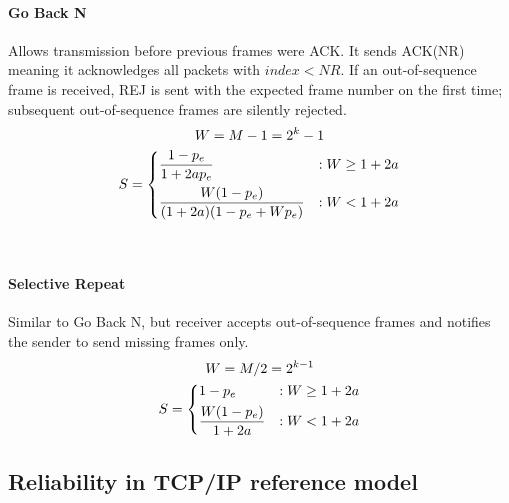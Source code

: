 \documentclass{form}
\begin{document}
\begin{minipage}[c]{0.58\textwidth}
    \begin{minipage}[t]{0.60\linewidth}
        \paragraph{Go Back N}
        Allows transmission before previous frames were ACK. It sends ACK(NR) meaning it acknowledges all packets with $index < NR$.
        If an out-of-sequence frame is received, REJ is sent with the expected frame number on the first time; subsequent out-of-sequence frames are silently rejected.
        \vspace{-1em}
        \begin{gather*}
            W = M-1 = 2^k-1 \\
            S = \begin{dcases}
                    \frac{1-p_e}{1+2ap_e}               & : W \geq 1+2a \\
                    \frac{W(1-p_e)}{(1+2a)(1-p_e+Wp_e)} & : W < 1+2a
                \end{dcases}
        \end{gather*}
    \end{minipage}~
    \begin{minipage}[t]{0.38\linewidth}
        \paragraph{Selective Repeat}
        Similar to Go Back N, but receiver accepts out-of-sequence frames and notifies the sender to send missing frames only.
        \begin{gather*}
            W = M/2 = 2^{k-1} \\
            S = \begin{dcases}
                1-p_e                 & : W \geq 1+2a \\
                \frac{W(1-p_e)}{1+2a} & : W < 1+2a
            \end{dcases}
        \end{gather*}
    \end{minipage}

    \subsection*{Reliability in TCP/IP reference model}
    


\end{minipage}
\end{document}
